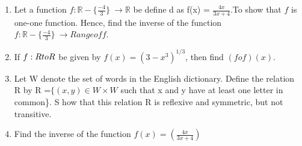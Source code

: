 \begin{enumerate}
\item Let a function \( f : \mathbb{R} - \{\frac{-4}{3} \} \ \to \mathbb{R} \) be define    d as f(x) = $\frac{4x}{3x+4}$.To show that \(f\) is one-one function. Hence, find the inverse of the function \( f : \mathbb{R} -\{\frac{-4}{3} \} \ \to Range of f \).      
\item If \(f : R \\to R\) be given by $ f(x) = (3 - x^3)^{1/3}$, then find $(fof) (x)$.             \item Let W denote the set of words in the English dictionary. Define the relation R by     R  =\(\{(x,y) \in W \times W\) such that x and y have at least one letter in common\}. S    how that this relation R is reflexive and symmetric, but not transitive.                
\item Find the inverse of the function $f(x)=\left( \frac{4x}{3x+4} \right)$
\end{enumerate}

